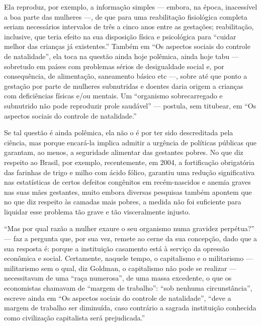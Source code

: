 Ela reproduz, por exemplo, a informação simples
--- embora, na época, inacessível a boa parte das mulheres ---, de que
para uma reabilitação fisiológica completa seriam necessários intervalos
de três a cinco anos entre as gestações; reabilitação, inclusive, que
teria efeito na sua disposição física e psicológica para ``cuidar melhor
das crianças já existentes.'' Também em ``Os aspectos sociais do
controle de natalidade'', ela toca na questão ainda hoje polêmica, ainda
hoje tabu --- sobretudo em países com problemas sérios de desigualdade
social e, por consequência, de alimentação, saneamento básico etc ---,
sobre até que ponto a gestação por parte de mulheres subnutridas e
doentes daria origem a crianças com deficiências físicas e/ou mentais.
Um ``organismo sobrecarregado e subnutrido não pode reproduzir prole
saudável'' --- postula, sem titubear, em ``Os aspectos sociais do
controle de natalidade.''

Se tal questão é ainda polêmica, ela
não o é por ter sido descreditada pela ciência, mas porque encará-la
implica admitir a urgência de políticas públicas que garantam, ao menos,
a seguridade alimentar das gestantes pobres. No que diz respeito ao
Brasil, por exemplo, recentemente, em 2004, a fortificação obrigatória
das farinhas de trigo e milho com ácido fólico, garantiu uma redução
significativa nas estatísticas de certos defeitos congênitos em
recém-nascidos e anemia graves nas suas mães gestantes, muito embora
diversas pesquisas também apontem que no que diz respeito às camadas
mais pobres, a medida não foi suficiente para liquidar esse problema tão
grave e tão visceralmente injusto.

``Mas por qual razão a mulher exaure o seu organismo numa gravidez
perpétua?'' --- faz a pergunta que, por sua vez, remete ao cerne da sua
concepção, dado que a sua resposta é: porque a instituição casamento
está à serviço da opressão econômica e social. Certamente, naquele
tempo, o capitalismo e o militarismo --- militarismo sem o qual, diz
Goldman, o capitalismo não pode se realizar --- necessitavam de uma
``raça numerosa'', de uma massa excedente, o que os economistas chamavam
de ``margem de trabalho'': ``sob nenhuma circunstância'', escreve ainda
em ``Os aspectos sociais do controle de natalidade'', ``deve a margem de
trabalho ser diminuída, caso contrário a sagrada instituição conhecida
como civilização capitalista será prejudicada.''

